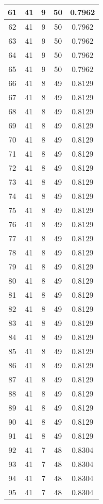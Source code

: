 \documentclass[letterpaper, 12pt]{article}
\begin{document}
\begin{longtable}{|c|c|c|c|c|}
\hline
61 & 41 & 9 & 50 & 0.7962 \\
\hline
62 & 41 & 9 & 50 & 0.7962 \\
\hline
63 & 41 & 9 & 50 & 0.7962 \\
\hline
64 & 41 & 9 & 50 & 0.7962 \\
\hline
65 & 41 & 9 & 50 & 0.7962 \\
\hline
66 & 41 & 8 & 49 & 0.8129 \\
\hline
67 & 41 & 8 & 49 & 0.8129 \\
\hline
68 & 41 & 8 & 49 & 0.8129 \\
\hline
69 & 41 & 8 & 49 & 0.8129 \\
\hline
70 & 41 & 8 & 49 & 0.8129 \\
\hline
71 & 41 & 8 & 49 & 0.8129 \\
\hline
72 & 41 & 8 & 49 & 0.8129 \\
\hline
73 & 41 & 8 & 49 & 0.8129 \\
\hline
74 & 41 & 8 & 49 & 0.8129 \\
\hline
75 & 41 & 8 & 49 & 0.8129 \\
\hline
76 & 41 & 8 & 49 & 0.8129 \\
\hline
77 & 41 & 8 & 49 & 0.8129 \\
\hline
78 & 41 & 8 & 49 & 0.8129 \\
\hline
79 & 41 & 8 & 49 & 0.8129 \\
\hline
80 & 41 & 8 & 49 & 0.8129 \\
\hline
81 & 41 & 8 & 49 & 0.8129 \\
\hline
82 & 41 & 8 & 49 & 0.8129 \\
\hline
83 & 41 & 8 & 49 & 0.8129 \\
\hline
84 & 41 & 8 & 49 & 0.8129 \\
\hline
85 & 41 & 8 & 49 & 0.8129 \\
\hline
86 & 41 & 8 & 49 & 0.8129 \\
\hline
87 & 41 & 8 & 49 & 0.8129 \\
\hline
88 & 41 & 8 & 49 & 0.8129 \\
\hline
89 & 41 & 8 & 49 & 0.8129 \\
\hline
90 & 41 & 8 & 49 & 0.8129 \\
\hline
91 & 41 & 8 & 49 & 0.8129 \\
\hline
92 & 41 & 7 & 48 & 0.8304 \\
\hline
93 & 41 & 7 & 48 & 0.8304 \\
\hline
94 & 41 & 7 & 48 & 0.8304 \\
\hline
95 & 41 & 7 & 48 & 0.8304 \\

\end{longtable}
\end{document}
